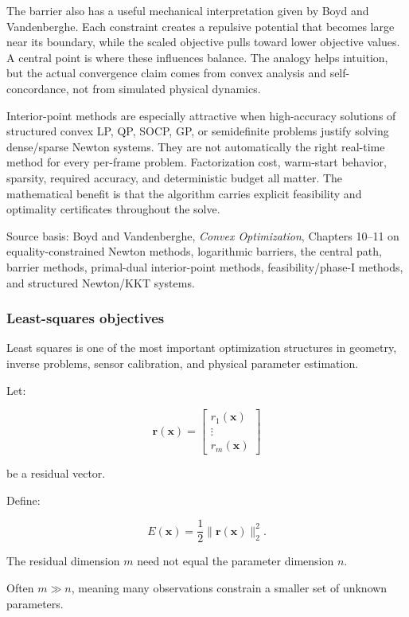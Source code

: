 The barrier also has a useful mechanical interpretation given by Boyd and Vandenberghe. Each constraint creates a repulsive potential that becomes large near its boundary, while the scaled objective pulls toward lower objective values. A central point is where these influences balance. The analogy helps intuition, but the actual convergence claim comes from convex analysis and self-concordance, not from simulated physical dynamics.

Interior-point methods are especially attractive when high-accuracy solutions of structured convex LP, QP, SOCP, GP, or semidefinite problems justify solving dense/sparse Newton systems. They are not automatically the right real-time method for every per-frame problem. Factorization cost, warm-start behavior, sparsity, required accuracy, and deterministic budget all matter. The mathematical benefit is that the algorithm carries explicit feasibility and optimality certificates throughout the solve.

Source basis: Boyd and Vandenberghe, \emph{Convex Optimization}, Chapters 10--11 on equality-constrained Newton methods, logarithmic barriers, the central path, barrier methods, primal-dual interior-point methods, feasibility/phase-I methods, and structured Newton/KKT systems.

\subsubsection{Least-squares objectives}\label{least-squares-objectives}

Least squares is one of the most important optimization structures in geometry, inverse problems, sensor calibration, and physical parameter estimation.

Let:

\[
\mathbf r(\mathbf x)= \begin{bmatrix} r_1(\mathbf x)\\ \vdots\\ r_m(\mathbf x) \end{bmatrix}
\]

be a residual vector.

Define:

\[
\boxed{ E(\mathbf x)=\frac12\|\mathbf r(\mathbf x)\|_2^2 }.
\]

The residual dimension \(m\) need not equal the parameter dimension \(n\).

Often \(m\gg n\), meaning many observations constrain a smaller set of unknown parameters.

